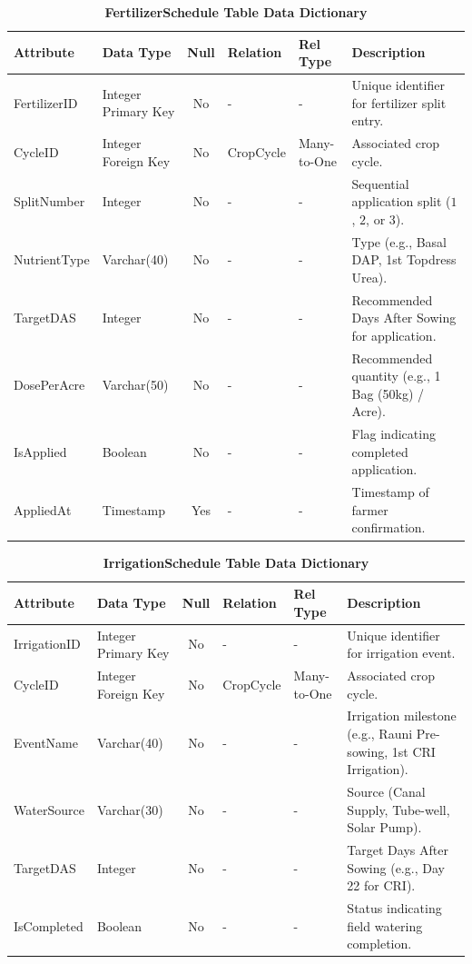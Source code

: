 \documentclass{FastFyp}
\begin{document}
\begin{table}[!htbp]
\footnotesize
\centering
\caption{\label{tab:fertilizer_table} \textbf{FertilizerSchedule Table Data Dictionary}}
\begin{tabular}{|l|l|c|l|l|p{4.5cm}|}
\hline
\textbf{Attribute} & \textbf{Data Type} & \textbf{Null} & \textbf{Relation} & \textbf{Rel Type} & \textbf{Description} \\ \hline
FertilizerID & Integer Primary Key & No & - & - & Unique identifier for fertilizer split entry. \\ \hline
CycleID & Integer Foreign Key & No & CropCycle & Many-to-One & Associated crop cycle. \\ \hline
SplitNumber & Integer & No & - & - & Sequential application split ($1$, $2$, or $3$). \\ \hline
NutrientType & Varchar(40) & No & - & - & Type (e.g., Basal DAP, 1st Topdress Urea). \\ \hline
TargetDAS & Integer & No & - & - & Recommended Days After Sowing for application. \\ \hline
DosePerAcre & Varchar(50) & No & - & - & Recommended quantity (e.g., 1 Bag (50kg) / Acre). \\ \hline
IsApplied & Boolean & No & - & - & Flag indicating completed application. \\ \hline
AppliedAt & Timestamp & Yes & - & - & Timestamp of farmer confirmation. \\ \hline
\end{tabular}
\end{table}

\begin{table}[!htbp]
\footnotesize
\centering
\caption{\label{tab:irrigation_table} \textbf{IrrigationSchedule Table Data Dictionary}}
\begin{tabular}{|l|l|c|l|l|p{4.5cm}|}
\hline
\textbf{Attribute} & \textbf{Data Type} & \textbf{Null} & \textbf{Relation} & \textbf{Rel Type} & \textbf{Description} \\ \hline
IrrigationID & Integer Primary Key & No & - & - & Unique identifier for irrigation event. \\ \hline
CycleID & Integer Foreign Key & No & CropCycle & Many-to-One & Associated crop cycle. \\ \hline
EventName & Varchar(40) & No & - & - & Irrigation milestone (e.g., Rauni Pre-sowing, 1st CRI Irrigation). \\ \hline
WaterSource & Varchar(30) & No & - & - & Source (Canal Supply, Tube-well, Solar Pump). \\ \hline
TargetDAS & Integer & No & - & - & Target Days After Sowing (e.g., Day 22 for CRI). \\ \hline
IsCompleted & Boolean & No & - & - & Status indicating field watering completion. \\ \hline
\end{tabular}
\end{table}
\end{document}
